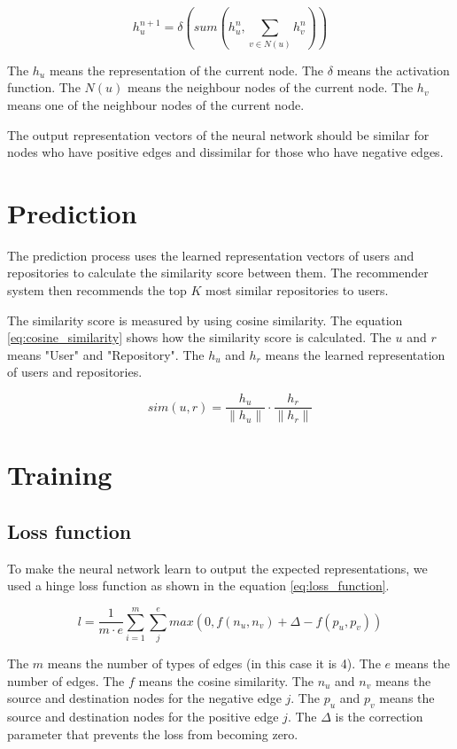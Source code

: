 \documentclass[11pt,twoside]{report}
\begin{document}
\begin{equation}
    h_u^{n+1}=\delta(sum(h_u^n, \sum_{v\in{N(u)}}h_v^n))
    \label{eq:message_passing_aggregation}
\end{equation}

The $h_u$ means the representation of the current node. The $\delta$ means the activation function. The $N(u)$ means the neighbour nodes of the current node. The $h_v$ means one of the neighbour nodes of the current node.

The output representation vectors of the neural network should be similar for nodes who have positive edges and dissimilar for those who have negative edges.

\section{Prediction}
The prediction process uses the learned representation vectors of users and repositories to calculate the similarity score between them. The recommender system then recommends the top $K$ most similar repositories to users.

The similarity score is measured by using cosine similarity. The equation \ref{eq:cosine_similarity} shows how the similarity score is calculated. The $u$ and $r$ means "User" and "Repository". The $h_u$ and $h_r$ means the learned representation of users and repositories.

\begin{equation}
    sim(u, r) = \frac{h_u}{\|h_u\|}\cdot\frac{h_r}{\|h_r\|}
    \label{eq:cosine_similarity}
\end{equation}

\section{Training}
\subsection{Loss function}
To make the neural network learn to output the expected representations, we used a hinge loss function as shown in the equation \ref{eq:loss_function}.

\begin{equation}
    l=\frac{1}{m\cdot{e}}\sum_{i=1}^{m}\sum_{j}^{e} max(0, f(n_u, n_v)+\Delta-f(p_u, p_v))
    \label{eq:loss_function}
\end{equation}

The $m$ means the number of types of edges (in this case it is 4). The $e$ means the number of edges. The $f$ means the cosine similarity. The $n_u$ and $n_v$ means the source and destination nodes for the negative edge $j$. The $p_u$ and $p_v$ means the source and destination nodes for the positive edge $j$. The $\Delta$ is the correction parameter that prevents the loss from becoming zero.
\end{document}
